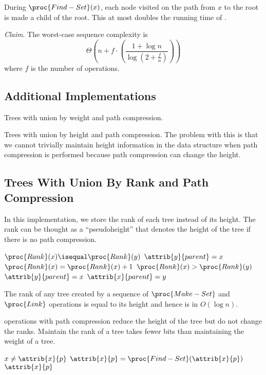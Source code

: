 During $\proc{Find-Set}(x)$, each node visited on the path from $x$ to the root is made a child of the root. This at most doubles the running time of .

\textit{Claim}. The worst-case sequence complexity is 
$$
\Theta \left( n + f \cdot \left( \frac{1+ \log n}{\log (2 + \frac{f}{n})} \right) \right)
$$
where $f$ is the number of  operations.

\subsection{Additional Implementations}

Trees with union by weight and path compression. 

Trees with union by height and path compression. The problem with this is that we cannot trivially maintain height information in the data structure when path compression is performed because path compression can change the height.

\subsection{Trees With Union By Rank and Path Compression}

In this implementation, we store the rank of each tree instead of its height. The rank can be thought as a ``pseudoheight'' that denotes the height of the tree if there is no path compression.

\begin{codebox}
    \li \If $\proc{Rank}(x) \isequal \proc{Rank}(y)$ \Then
        \li $\attrib{y}{parent} = x$
        \li $\proc{Rank}(x) = \proc{Rank}(x) + 1$
    \li \ElseIf  $\proc{Rank}(x) > \proc{Rank}(y)$ \Then
        \li $\attrib{y}{parent} = x$
    \li \Else
        \li $\attrib{x}{parent} = y$
\end{codebox}

The rank of any tree created by a sequence of $\proc{Make-Set}$ and $\proc{Link}$ operations is equal to its height and hence is in $O(\log n)$.

 operations with path compression reduce the height of the tree but do not change the ranks. Maintain the rank of a tree takes fewer bits than maintaining the weight of a tree.

\begin{codebox}
    \li \If $x \neq \attrib{x}{p}$ \Then
        \li $\attrib{x}{p} = \proc{Find-Set}(\attrib{x}{p})$
        \End
    \li \Return $\attrib{x}{p}$ 
\end{codebox}

